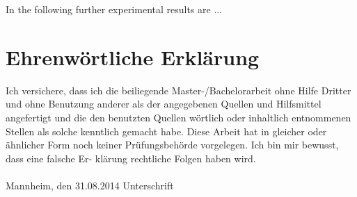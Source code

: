 \documentclass[11pt,titlepage,oneside,openany]{book}
\begin{document}
In the following further experimental results are ...


\newpage


\pagestyle{empty}


\section*{Ehrenw\"ortliche Erkl\"arung}
Ich versichere, dass ich die beiliegende Master-/Bachelorarbeit ohne Hilfe Dritter
und ohne Benutzung anderer als der angegebenen Quellen und Hilfsmittel
angefertigt und die den benutzten Quellen w\"ortlich oder inhaltlich
entnommenen Stellen als solche kenntlich gemacht habe. Diese Arbeit
hat in gleicher oder \"ahnlicher Form noch keiner Pr\"ufungsbeh\"orde
vorgelegen. Ich bin mir bewusst, dass eine falsche Er- kl\"arung rechtliche Folgen haben
wird.
\\
\\

\noindent
Mannheim, den 31.08.2014 \hspace{4cm} Unterschrift
\end{document}
